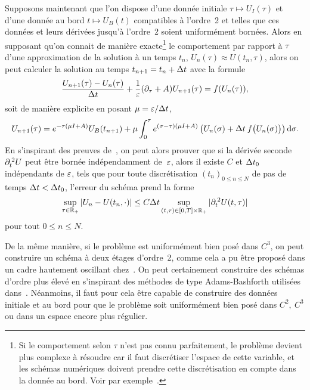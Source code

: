 Supposons maintenant que l'on dispose d'une donnée initiale $\tau \mapsto U_I(\tau)$ et d'une donnée au bord $t \mapsto U_B(t)$ compatibles à l'ordre~2 et telles que ces données et leurs dérivées jusqu'à l'ordre~2 soient uniformément bornées. Alors en supposant qu'on connait de manière exacte\footnote{%
    Si le comportement selon $\tau$ n'est pas connu parfaitement, le problème devient plus complexe à résoudre car il faut discrétiser l'espace de cette variable, et les schémas numériques doivent prendre cette discrétisation en compte dans la donnée au bord. Voir par exemple~\cite{boutin.2019.high}.
} le comportement par rapport à $\tau$ d'une approximation de la solution à un temps $t_n$, $U_n(\tau) \approx U(t_n, \tau)$, alors on peut calculer la solution au temps $t_{n+1} = t_n + \Delta t$ avec la formule
\begin{equation*}
    \frac{U_{n+1}(\tau) - U_n(\tau)}{\Delta t} 
        + \frac{1}{\varepsilon}(\partial_\tau + A) U_{n+1}(\tau)
    = f(U_n(\tau)) ,
\end{equation*}
soit de manière explicite en posant $\mu = \varepsilon/\Delta t$, 
\begin{equation*}
    U_{n+1}(\tau) = e^{-\tau (\mu I + A)} U_B(t_{n+1}) 
        + \mu \int_0^{\tau} e^{(\sigma - \tau)(\mu I + A)} \left(
            U_n(\sigma) + \Delta t\: f\big( U_n(\sigma) \big)
        \right) \mathrm{d}\sigma .
\end{equation*}
En s'inspirant des preuves de~\cite{chartier.2015.uniformly}, on peut alors prouver que si la dérivée seconde $\partial_t^{\: 2} U$ peut être bornée indépendamment de~$\varepsilon$, alors il existe $C$ et $\Delta t_0$ indépendants de $\varepsilon$, tels que pour toute discrétisation $(t_n)_{0 \leq n \leq N}$ de pas de temps $\Delta t < \Delta t_0$, l'erreur du schéma prend la forme
\begin{equation*}
    \sup_{\tau \in \mathbb{R}_+} | U_{n} - U(t_n, \cdot) |
    \leq C \Delta t \sup_{(t,\tau) \in [0,T] \times \mathbb{R}_+} 
        | \partial_t^{\: 2} U(t,\tau) | 
\end{equation*}
pour tout $0 \leq n \leq N$.

De la même manière, si le problème est uniformément bien posé dans $C^3$, on peut construire un schéma à deux étages d'ordre~2, comme cela a pu être proposé dans un cadre hautement oscillant chez~\cite{chartier.2015.uniformly}. On peut certainement construire des schémas d'ordre plus élevé en s'inspirant des méthodes de type Adams-Bashforth utilisées dans~\cite{chartier.2020.derivative}. Néanmoins, il faut pour cela être capable de construire des données initiale et au bord pour que le problème soit uniformément bien posé dans $C^2,\ C^3$ ou dans un espace encore plus régulier. 


